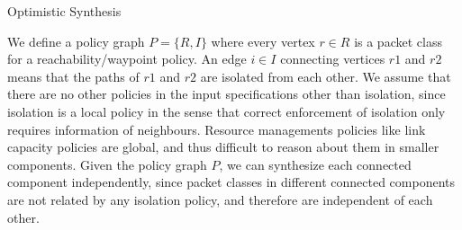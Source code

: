 \begin{algorithm}[h]
	\caption{Optimistic Synthesis}
	\label{optimisticsyn}
	\begin{algorithmic}[1]
		\Else
		  \EndIf
		  \EndIf
		\Else
		\EndIf
		\EndWhile
		\EndIf
		\EndProcedure
	\end{algorithmic}
\end{algorithm}

We define a policy graph $P = \{R, I\}$ where every vertex $r \in R$
is a packet class for a reachability/waypoint policy.
An edge $i \in I$ connecting
vertices $r1$ and $r2$ means that the paths of $r1$ and $r2$ are
isolated from each other. We assume that there are no other policies
in the input specifications other than isolation, since isolation is a local policy 
in the sense that correct enforcement of isolation only requires information of neighbours. 
Resource managements policies like link capacity policies are global,
 and thus difficult to reason about them in smaller components.
  Given the policy graph $P$, we
can synthesize each connected component independently, since packet
classes in different connected components are not related by any
isolation policy, and therefore are independent of each other.

